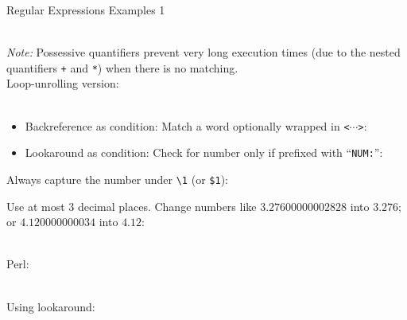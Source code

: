 \documentclass[10pt, a4paper, landscape]{scrartcl}
\newcommand{\regex}[1]{\texttt{#1}}
\newcommand{\cregex}[1]{\colorbox{gray!30}{\regex{#1}}}
\newcommand{\code}[1]{\texttt{#1}}
\newcommand{\bs}{\textbackslash}
\newcommand{\reshortexample}[1]{\cregex{}}
\newcommand{\relongexample}[1]{\regex{}}
\begin{document}
\begin{cheatsheet}{Regular Expressions Examples 1}

\begin{col1}


\reshortexample{./quoted_string.tex}\\
\emph{Note:} Possessive quantifiers prevent very long execution times (due to
the nested quantifiers \cregex{+} and \cregex{*}) when there is no matching.\\
Loop-unrolling version:\\
\reshortexample{./quoted_string_lu.tex}\\


\begin{itemize}
	\item Backreference as condition: Match a word optionally wrapped in \code{<$\cdots$>}:\\
	\reshortexample{./cond_backref.tex}
	\item Lookaround as condition: Check for number only if prefixed with ``\code{NUM:}'':\\
	\reshortexample{./cond_lookaround.tex}
\end{itemize}


Always capture the number under \cregex{\bs{}1} (or \cregex{\$1}):\\
\reshortexample{./branch_reset.tex}


Use at most $3$ decimal places. Change numbers like $3.27600000002828$ into
$3.276$; or $4.120000000034$ into $4.12$:\\
\reshortexample{./fixfloat.tex}\\

\end{col1}

\begin{col2}


Perl:\\
\relongexample{./extract_filename.tex}\\


Using lookaround:\\
\reshortexample{./thousandsep_1.tex}\\


\end{col2}
\end{cheatsheet}
\end{document}
